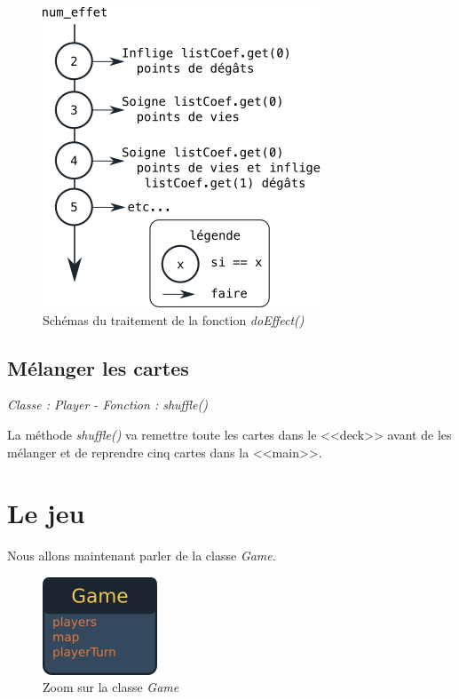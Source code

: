 \documentclass[a4paper, titlepage]{livret}
\begin{document}
         \begin{figure}[th]
          \begin{center}
            \includegraphics[scale=0.5]{Assets/decisionEffet.png}
            \caption{Schémas du traitement de la fonction \textit{doEffect()}}
            \label{decisionEffet}
          \end{center}
        \end{figure}
      
          \subsection{Mélanger les cartes}
            \begin{center}
            \textit{Classe : Player - Fonction : shuffle()}
            \end{center}
              La méthode \textit{shuffle()} va remettre toute les cartes dans le <<deck>> avant de les mélanger et de reprendre cinq cartes dans la <<main>>.
            
    \section{Le jeu}
     Nous allons maintenant parler de la classe \textit{Game}.
      
     \begin{figure}[th]
        \begin{center}
          \includegraphics[scale=0.4]{Assets/UMLGame.png}
          \caption{Zoom sur la classe \textit{Game}}
          \label{figUMLGame}
        \end{center}
      \end{figure}
      
\end{document}
